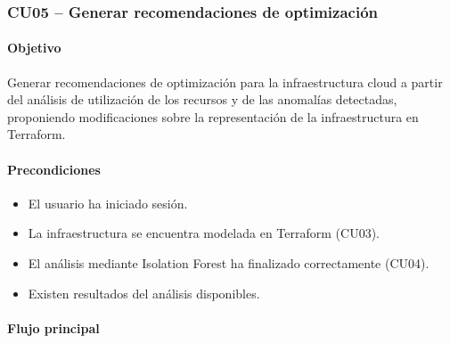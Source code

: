 \subsubsection{CU05 -- Generar recomendaciones de optimización}

\paragraph*{Objetivo}

Generar recomendaciones de optimización para la infraestructura cloud a partir del análisis de utilización de los recursos y de las anomalías detectadas, proponiendo modificaciones sobre la representación de la infraestructura en Terraform.

\paragraph*{Precondiciones}

\begin{itemize}
\item El usuario ha iniciado sesión.
\item La infraestructura se encuentra modelada en Terraform (CU03).
\item El análisis mediante Isolation Forest ha finalizado correctamente (CU04).
\item Existen resultados del análisis disponibles.
\end{itemize}

\paragraph*{Flujo principal}

